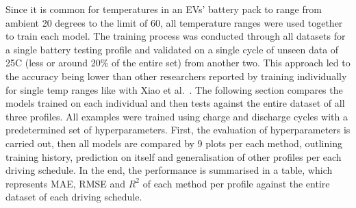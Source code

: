 %
Since it is common for temperatures in an EVs' battery pack to range from ambient 20 degrees to the limit of 60, all temperature ranges were used together to train each model.
The training process was conducted through all datasets for a single battery testing profile and validated on a single cycle of unseen data of 25\textdegree{}C (less or around 20\% of the entire set) from another two. 
This approach led to the accuracy being lower than other researchers reported by training individually for single temp ranges like with Xiao et al.~\cite{xiao_accurate_2019}.
The following section compares the models trained on each individual and then tests against the entire dataset of all three profiles.
All examples were trained using charge and discharge cycles with a predetermined set of hyperparameters. %
First, the evaluation of hyperparameters is carried out, then all models are compared by 9 plots per each method, outlining training history, prediction on itself and generalisation of other profiles per each driving schedule.
In the end, the performance is summarised in a table, which represents MAE, RMSE and $R^2$ of each method per profile against the entire dataset of each driving schedule.
%

%


